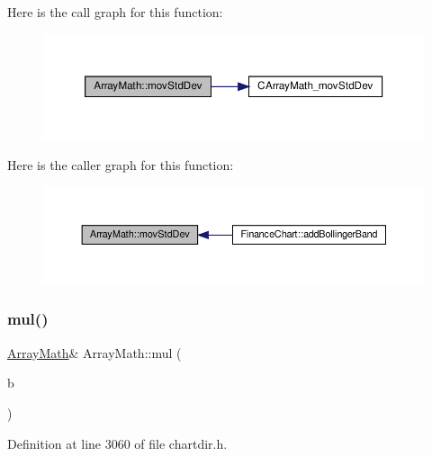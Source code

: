 Here is the call graph for this function\+:
\nopagebreak
\begin{figure}[H]
\begin{center}
\leavevmode
\includegraphics[width=350pt]{class_array_math_a0352f506e872e964ef2590fa7e8ce581_cgraph}
\end{center}
\end{figure}
Here is the caller graph for this function\+:
\nopagebreak
\begin{figure}[H]
\begin{center}
\leavevmode
\includegraphics[width=350pt]{class_array_math_a0352f506e872e964ef2590fa7e8ce581_icgraph}
\end{center}
\end{figure}
\mbox{\label{class_array_math_a4fb34b6f319e7f3b2a5440d426832889}} 
\subsubsection{\texorpdfstring{mul()}{mul()}\hspace{0.1cm}{\footnotesize\ttfamily [1/2]}}
{\footnotesize\ttfamily \hyperlink{class_array_math}{Array\+Math}\& Array\+Math\+::mul (\begin{DoxyParamCaption}\item[{\hyperlink{class_double_array}{Double\+Array}}]{b }\end{DoxyParamCaption})\hspace{0.3cm}{\ttfamily [inline]}}



Definition at line 3060 of file chartdir.\+h.

